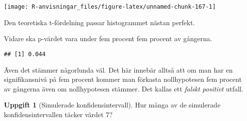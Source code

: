 \documentclass[
]{book}
\newenvironment{Shaded}{\begin{snugshade}}{\end{snugshade}}
\newcommand{\FloatTok}[1]{\textcolor[rgb]{0.00,0.00,0.81}{#1}}
\newcommand{\FunctionTok}[1]{\textcolor[rgb]{0.13,0.29,0.53}{\textbf{#1}}}
\newcommand{\NormalTok}[1]{#1}
\newcommand{\SpecialCharTok}[1]{\textcolor[rgb]{0.81,0.36,0.00}{\textbf{#1}}}
\theoremstyle{definition}
\theoremstyle{definition}
\theoremstyle{definition}
\newtheorem{exercise}{Uppgift}[chapter]
\theoremstyle{definition}
\theoremstyle{remark}
\begin{document}
\begin{center}\texttt{[image: R-anvisningar\_files/figure-latex/unnamed-chunk-167-1]} \end{center}

Den teoretiska t-fördelning passar histogrammet nästan perfekt.

Vidare ska p-värdet vara under fem procent fem procent av gångerna.

\begin{Shaded}
\end{Shaded}

\begin{verbatim}
## [1] 0.044
\end{verbatim}

Även det stämmer någorlunda väl. Det här innebär alltså att om man har en signifikansnivå på fem procent kommer man förkasta nollhypotesen fem procent av gångerna även om nollhypotesen stämmer. Det kallas ett \emph{falskt positivt} utfall.

\begin{exercise}[Simulerade konfidensintervall]
Hur många av de simulerade konfidensintervallen täcker värdet 7?
\end{exercise}
\end{document}
